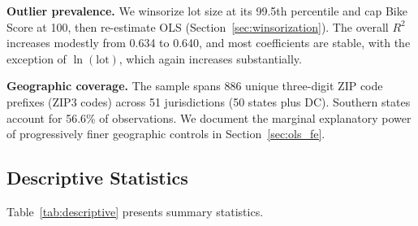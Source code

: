 \textbf{Outlier prevalence.} We winsorize lot size at its 99.5th percentile and cap Bike Score at 100, then re-estimate OLS (Section~\ref{sec:winsorization}). The overall $R^2$ increases modestly from 0.634 to 0.640, and most coefficients are stable, with the exception of $\ln(\text{lot})$, which again increases substantially.

\textbf{Geographic coverage.} The sample spans 886 unique three-digit ZIP code prefixes (ZIP3 codes) across 51 jurisdictions (50 states plus DC). Southern states account for 56.6\% of observations. We document the marginal explanatory power of progressively finer geographic controls in Section~\ref{sec:ols_fe}.

\subsection{Descriptive Statistics}

Table~\ref{tab:descriptive} presents summary statistics.

